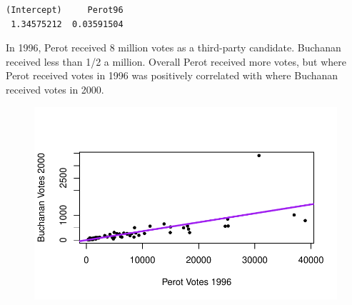 \documentclass[
  letterpaper,
  DIV=11,
  numbers=noendperiod]{scrreprt}
\newenvironment{Shaded}{\begin{snugshade}}{\end{snugshade}}
\newcommand{\AttributeTok}[1]{\textcolor[rgb]{0.40,0.45,0.13}{#1}}
\newcommand{\DecValTok}[1]{\textcolor[rgb]{0.68,0.00,0.00}{#1}}
\newcommand{\FunctionTok}[1]{\textcolor[rgb]{0.28,0.35,0.67}{#1}}
\newcommand{\NormalTok}[1]{\textcolor[rgb]{0.00,0.23,0.31}{#1}}
\newcommand{\SpecialCharTok}[1]{\textcolor[rgb]{0.37,0.37,0.37}{#1}}
\newcommand{\StringTok}[1]{\textcolor[rgb]{0.13,0.47,0.30}{#1}}
\begin{document}
\begin{verbatim}
(Intercept)     Perot96 
 1.34575212  0.03591504 
\end{verbatim}

In 1996, Perot received 8 million votes as a third-party candidate.
Buchanan received less than 1/2 a million. Overall Perot received more
votes, but where Perot received votes in 1996 was positively correlated
with where Buchanan received votes in 2000.

\begin{Shaded}
\end{Shaded}

\begin{figure}[H]

{\centering \includegraphics{08-Regression_files/figure-pdf/unnamed-chunk-31-1.pdf}

}

\end{figure}

\begin{Shaded}
\end{Shaded}
\end{document}
